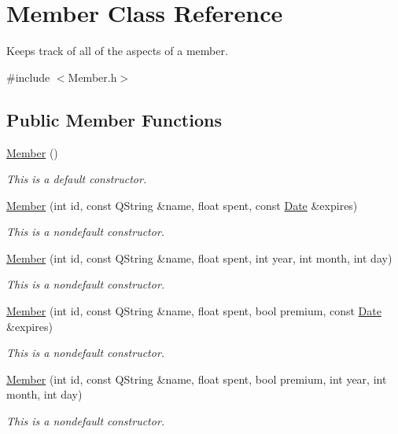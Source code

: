 \hypertarget{class_member}{}\section{Member Class Reference}
\label{class_member}


Keeps track of all of the aspects of a member.  




{\ttfamily \#include $<$Member.\+h$>$}

\subsection*{Public Member Functions}
\begin{DoxyCompactItemize}
\item 
\hyperlink{class_member_a44241aa6aa9b792b550d9cc29e7ad050}{Member} ()
\begin{DoxyCompactList}\small\item\em This is a default constructor. \end{DoxyCompactList}\item 
\hyperlink{class_member_aaba53c848d96f8612112bf13401ad1ef}{Member} (int id, const Q\+String \&name, float spent, const \hyperlink{class_date}{Date} \&expires)
\begin{DoxyCompactList}\small\item\em This is a nondefault constructor. \end{DoxyCompactList}\item 
\hyperlink{class_member_a83f3b1e6044c453f100090e5135327b2}{Member} (int id, const Q\+String \&name, float spent, int year, int month, int day)
\begin{DoxyCompactList}\small\item\em This is a nondefault constructor. \end{DoxyCompactList}\item 
\hyperlink{class_member_a045f335f95c4d4d46ddf59b715a822a0}{Member} (int id, const Q\+String \&name, float spent, bool premium, const \hyperlink{class_date}{Date} \&expires)
\begin{DoxyCompactList}\small\item\em This is a nondefault constructor. \end{DoxyCompactList}\item 
\hyperlink{class_member_a8635ea86acc412cb9dedf7773f01b0fb}{Member} (int id, const Q\+String \&name, float spent, bool premium, int year, int month, int day)
\begin{DoxyCompactList}\small\item\em This is a nondefault constructor. \end{DoxyCompactList}\item 

\end{DoxyCompactItemize}
